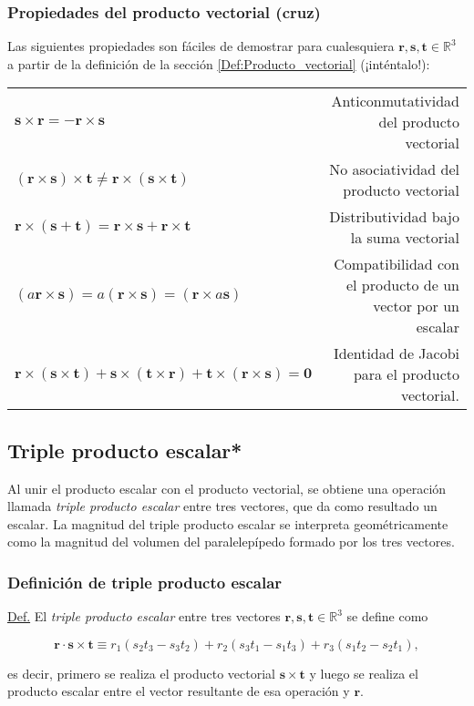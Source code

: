 \documentclass[12pt]{article}
\begin{document}
\subsubsection{Propiedades del producto vectorial (cruz)} \label{Prop:Producto_vectorial}

Las siguientes propiedades son fáciles de demostrar para cualesquiera $\mathbf{r},\mathbf{s},\mathbf{t}\in\mathbb{R}^3$ a partir de la definición de la sección \ref{Def:Producto_vectorial} (¡inténtalo!):

\begin{center}
\begin{tabular}{lr}
    $\mathbf{s}\times\mathbf{r} = -\mathbf{r}\times\mathbf{s}$ & Anticonmutatividad del producto vectorial \\
    $(\mathbf{r}\times\mathbf{s})\times\mathbf{t}\neq\mathbf{r}\times(\mathbf{s}\times\mathbf{t})$ & No asociatividad del producto vectorial \\
    $\mathbf{r}\times(\mathbf{s}+\mathbf{t}) = \mathbf{r}\times\mathbf{s}+\mathbf{r}\times\mathbf{t}$ & Distributividad bajo la suma vectorial \\
    $(a\mathbf{r}\times\mathbf{s}) = a(\mathbf{r}\times\mathbf{s})=(\mathbf{r}\times a\mathbf{s})$ & Compatibilidad con el producto de un vector por un escalar\\
    $\mathbf{r}\times(\mathbf{s}\times\mathbf{t})+\mathbf{s}\times(\mathbf{t}\times\mathbf{r})+\mathbf{t}\times(\mathbf{r}\times\mathbf{s}) = \mathbf{0}$ & Identidad de Jacobi para el producto vectorial.
\end{tabular}
\end{center}



\subsection{Triple producto escalar*}

Al unir el producto escalar con el producto vectorial, se obtiene una operación llamada \emph{triple producto escalar} entre tres vectores, que da como resultado un escalar. La magnitud del triple producto escalar se interpreta geométricamente como la magnitud del volumen del paralelepípedo formado por los tres vectores.

\subsubsection{Definición de triple producto escalar}
\begin{tcolorbox}
\underline{Def.} El \emph{triple producto escalar} entre tres vectores $\mathbf{r},\mathbf{s},\mathbf{t}\in\mathbb{R}^3$ se define como

$$\mathbf{r}\cdot\mathbf{s}\times\mathbf{t} \equiv r_1(s_2t_3-s_3t_2) + r_2(s_3t_1-s_1t_3) + r_3(s_1t_2-s_2t_1),$$

\noindent es decir, primero se realiza el producto vectorial $\mathbf{s}\times\mathbf{t}$ y luego se realiza el producto escalar entre el vector resultante de esa operación y $\mathbf{r}$.
\end{tcolorbox}
\end{document}
